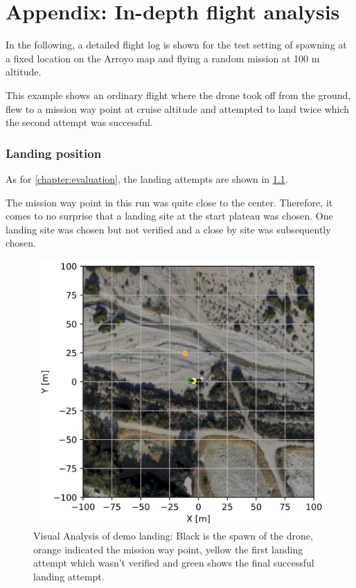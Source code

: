\chapter{Appendix: In-depth flight analysis}
\label{sec:specific_runs}

In the following, a detailed flight log is shown for the test setting of spawning at a fixed location on the Arroyo map and flying a random mission at 100 m altitude.

This example shows an ordinary flight where the drone took off from the ground, flew to a mission way point at cruise altitude and attempted to land twice which the second attempt was successful.

\subsection{Landing position}

As for \cref{chapter:evaluation}, the landing attempts are shown in \cref{fig:demo_run_landing}.


The mission way point in this run was quite close to the center. Therefore, it comes to no surprise that a landing site at the start plateau was chosen. One landing site was chosen but not verified and a close by site was subsequently chosen.

\clearpage%

\begin{figure}[h]
\centering
\includegraphics[scale=0.45]{images/appendix/run_analysis/demo_run.png}
\caption{Visual Analysis of demo landing: Black is the spawn of the drone, orange indicated the mission way point, yellow the first landing attempt which wasn't verified and green shows the final successful landing attempt.}
\label{fig:demo_run_landing}
\end{figure}
